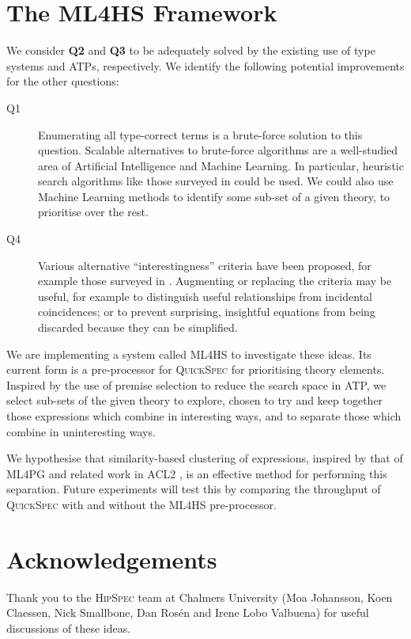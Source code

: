 \documentclass{llncs}
\begin{document}
\section{The \textsc{ML4HS} Framework}\label{ml4hs}

We consider \textbf{Q2} and \textbf{Q3} to be adequately solved by the existing
use of type systems and ATPs, respectively. We identify the following potential
improvements for the other questions:

\begin{description}
\item [Q1]
  Enumerating all type-correct terms is a brute-force solution to this question.
  Scalable alternatives to brute-force algorithms are a well-studied area of
  Artificial Intelligence and Machine Learning. In particular, heuristic
  search algorithms like those surveyed in \cite{blum2011hybrid} could be used.
  We could also use Machine Learning methods to identify some sub-set of a given
  theory, to prioritise over the rest.
\item [Q4]
  Various alternative ``interestingness'' criteria have been proposed, for
  example those surveyed in \cite{geng2006interestingness}. Augmenting or
  replacing the criteria may be useful, for example to distinguish useful
  relationships from incidental coincidences; or to prevent surprising,
  insightful equations from being discarded because they can be simplified.
\end{description}

We are implementing a system called \textsc{ML4HS} to investigate these ideas.
Its current form is a pre-processor for \textsc{QuickSpec} for prioritising
theory elements. Inspired by the use of premise selection
\cite{kuhlwein2012overview} to reduce the search space in ATP,
we select sub-sets of the given theory to explore, chosen to try and keep
together those expressions which combine in interesting ways, and to separate
those which combine in uninteresting ways.

We hypothesise that similarity-based clustering of expressions, inspired by that
of \textsc{ML4PG} \cite{journals/corr/abs-1212-3618} and related work in ACL2
\cite{heras2013proof}, is an effective method for performing this separation.
Future experiments will test this by comparing the throughput of
\textsc{QuickSpec} with and without the \textsc{ML4HS} pre-processor.

\section*{Acknowledgements}

Thank you to the \textsc{HipSpec} team at Chalmers University (Moa Johansson,
Koen Claessen, Nick Smallbone, Dan Ros{\'e}n and Irene Lobo Valbuena) for useful
discussions of these ideas.



\end{document}
